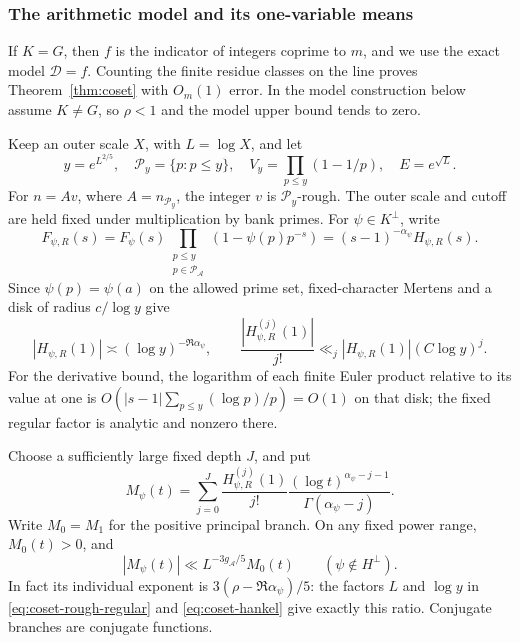 \subsubsection{The arithmetic model and its one-variable means}

If \(K=G\), then \(f\) is the indicator of integers coprime to
\(m\), and we use the exact model \(\mathcal D=f\). Counting the finite
residue classes on the line proves Theorem~\ref{thm:coset} with
\(O_m(1)\) error. In the model construction below assume
\(K\ne G\), so \(\rho<1\) and the model upper bound tends to zero.

Keep an outer scale \(X\), with \(L=\log X\), and let
\[
 y=e^{L^{2/5}},\quad \mathcal P_y=\{p:p\le y\},\quad
 V_y=\prod_{p\le y}(1-1/p),\quad E=e^{\sqrt L}.
\]
For \(n=A v\), where \(A=n_{\mathcal P_y}\), the integer \(v\) is
\(\mathcal P_y\)-rough. The outer scale and cutoff are held fixed
under multiplication by bank primes.
For \(\psi\in K^\perp\), write
\[
 F_{\psi,R}(s)=F_\psi(s)
        \prod_{\substack{p\le y\\p\in\mathcal P_{\mathscr A}}}
                         (1-\psi(p)p^{-s})
          =(s-1)^{-\alpha_\psi}H_{\psi,R}(s).
\]
Since \(\psi(p)=\psi(a)\) on the allowed prime set, fixed-character
Mertens and a disk of radius \(c/\log y\) give
\begin{equation}\label{eq:coset-rough-regular}
 |H_{\psi,R}(1)|\asymp(\log y)^{-\Re\alpha_\psi},\qquad
 \frac{|H_{\psi,R}^{(j)}(1)|}{j!}
       \ll_j|H_{\psi,R}(1)|(C\log y)^j.
\end{equation}
For the derivative bound, the logarithm of each finite Euler product
relative to its value at one is
\(O(|s-1|\sum_{p\le y}(\log p)/p)=O(1)\) on that disk;
the fixed regular factor is analytic and nonzero there.

Choose a sufficiently large fixed depth \(J\), and put
\begin{equation}\label{eq:coset-hankel}
 M_\psi(t)=\sum_{j=0}^J\frac{H_{\psi,R}^{(j)}(1)}{j!}
              \frac{(\log t)^{\alpha_\psi-j-1}}
                   {\Gamma(\alpha_\psi-j)}.
\end{equation}
Write \(M_0=M_1\) for the positive principal branch. On any fixed
power range, \(M_0(t)>0\), and
\begin{equation}\label{eq:coset-secondary-gap}
 |M_\psi(t)|\ll L^{-3g_{\mathscr A}/5}M_0(t)
                     \qquad(\psi\notin H^\perp).
\end{equation}
In fact its individual exponent is
\(3(\rho-\Re\alpha_\psi)/5\): the factors \(L\) and \(\log y\)
in \eqref{eq:coset-rough-regular} and \eqref{eq:coset-hankel}
give exactly this ratio. Conjugate branches are conjugate functions.

